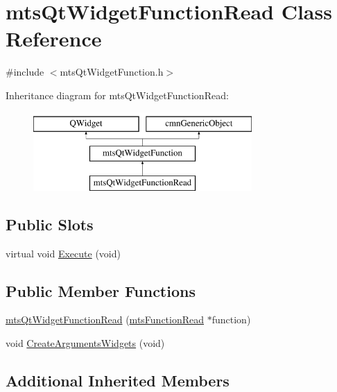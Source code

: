 \hypertarget{classmts_qt_widget_function_read}{\section{mts\-Qt\-Widget\-Function\-Read Class Reference}
\label{classmts_qt_widget_function_read}
}


{\ttfamily \#include $<$mts\-Qt\-Widget\-Function.\-h$>$}

Inheritance diagram for mts\-Qt\-Widget\-Function\-Read\-:\begin{figure}[H]
\begin{center}
\leavevmode
\includegraphics[height=3.000000cm]{df/d61/classmts_qt_widget_function_read}
\end{center}
\end{figure}
\subsection*{Public Slots}
\begin{DoxyCompactItemize}
\item 
virtual void \hyperlink{classmts_qt_widget_function_read_a9e8b711778c7819e64df3a664df7c3e7}{Execute} (void)
\end{DoxyCompactItemize}
\subsection*{Public Member Functions}
\begin{DoxyCompactItemize}
\item 
\hyperlink{classmts_qt_widget_function_read_a2ede581f357d1a69ec3775ae58ac9834}{mts\-Qt\-Widget\-Function\-Read} (\hyperlink{classmts_function_read}{mts\-Function\-Read} $\ast$function)
\item 
void \hyperlink{classmts_qt_widget_function_read_acc999830d56dc6a29614fcd3bd9a3b0b}{Create\-Arguments\-Widgets} (void)
\end{DoxyCompactItemize}
\subsection*{Additional Inherited Members}



